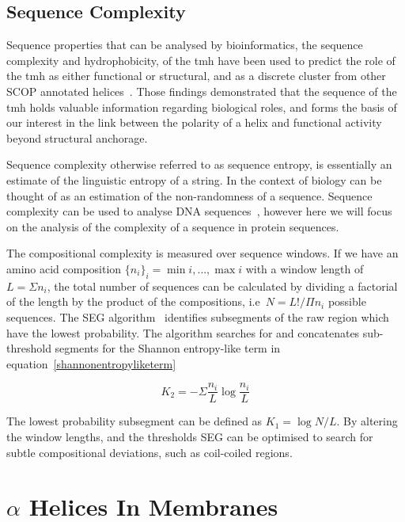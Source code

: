 \subsection{Sequence Complexity}

Sequence properties that can be analysed by bioinformatics, the sequence complexity and hydrophobicity, of the \gls{tmh} have been used to predict the role of the \gls{tmh} as either functional or structural, and as a discrete cluster from other SCOP annotated helices~\cite{Wong2012}.
Those findings demonstrated that the sequence of the \gls{tmh} holds valuable information regarding biological roles, and forms the basis of our interest in the link between the polarity of a helix and functional activity beyond structural anchorage.

Sequence complexity otherwise referred to as sequence entropy, is essentially an estimate of the linguistic entropy of a string.
In the context of biology can be thought of as an estimation of the non-randomness of a sequence.
Sequence complexity can be used to analyse DNA sequences~\cite{Pinho2013, Oliver1993, Troyanskaya2002}, however here we will focus on the analysis of the complexity of a sequence in protein sequences.

The compositional complexity is measured over sequence windows.
If we have an amino acid composition $\{{{n}_{i}}{\}}_{i}={\min{i}},\ldots,{\max{i}}$ with a window length of $L=\Sigma {n}_i $, the total number of sequences can be calculated by dividing a factorial of the length by the product of the compositions, i.e\  $ N = L!/\Pi{n}_i $ possible sequences.
The SEG algorithm~\cite{WOOTTON1994269, Wootton1996} identifies subsegments of the raw region which have the lowest probability.
The algorithm searches for and concatenates sub-threshold segments for the Shannon entropy-like term in equation~\ref{shannonentropyliketerm}

\begin{equation} \label{shannonentropyliketerm}
{K}_{2}=-\Sigma\frac{n_i}{L}\log\frac{n_i}{L}
\end{equation}

The lowest probability subsegment can be defined as $ K_1=\log N/L $.
By altering the window lengths, and the thresholds SEG can be optimised to search for subtle compositional deviations, such as coil-coiled regions.

\section{$\alpha$ Helices In Membranes }

